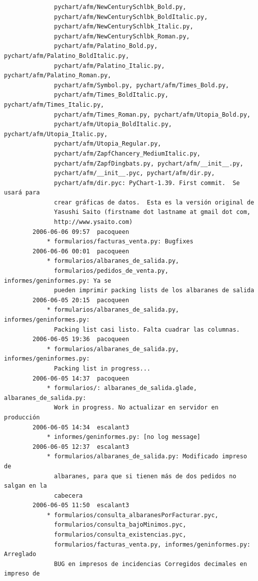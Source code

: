 \documentclass[a4paper]{article}
\begin{document}
\begin{verbatim}
              pychart/afm/NewCenturySchlbk_Bold.py,
              pychart/afm/NewCenturySchlbk_BoldItalic.py,
              pychart/afm/NewCenturySchlbk_Italic.py,
              pychart/afm/NewCenturySchlbk_Roman.py,
              pychart/afm/Palatino_Bold.py, pychart/afm/Palatino_BoldItalic.py,
              pychart/afm/Palatino_Italic.py, pychart/afm/Palatino_Roman.py,
              pychart/afm/Symbol.py, pychart/afm/Times_Bold.py,
              pychart/afm/Times_BoldItalic.py, pychart/afm/Times_Italic.py,
              pychart/afm/Times_Roman.py, pychart/afm/Utopia_Bold.py,
              pychart/afm/Utopia_BoldItalic.py, pychart/afm/Utopia_Italic.py,
              pychart/afm/Utopia_Regular.py,
              pychart/afm/ZapfChancery_MediumItalic.py,
              pychart/afm/ZapfDingbats.py, pychart/afm/__init__.py,
              pychart/afm/__init__.pyc, pychart/afm/dir.py,
              pychart/afm/dir.pyc: PyChart-1.39. First commit.  Se usará para
              crear gráficas de datos.  Esta es la versión original de
              Yasushi Saito (firstname dot lastname at gmail dot com,
              http://www.ysaito.com)
        2006-06-06 09:57  pacoqueen
            * formularios/facturas_venta.py: Bugfixes
        2006-06-06 00:01  pacoqueen
            * formularios/albaranes_de_salida.py,
              formularios/pedidos_de_venta.py, informes/geninformes.py: Ya se
              pueden imprimir packing lists de los albaranes de salida
        2006-06-05 20:15  pacoqueen
            * formularios/albaranes_de_salida.py, informes/geninformes.py:
              Packing list casi listo. Falta cuadrar las columnas.
        2006-06-05 19:36  pacoqueen
            * formularios/albaranes_de_salida.py, informes/geninformes.py:
              Packing list in progress...
        2006-06-05 14:37  pacoqueen
            * formularios/: albaranes_de_salida.glade, albaranes_de_salida.py:
              Work in progress. No actualizar en servidor en producción
        2006-06-05 14:34  escalant3
            * informes/geninformes.py: [no log message]
        2006-06-05 12:37  escalant3
            * formularios/albaranes_de_salida.py: Modificado impreso de
              albaranes, para que si tienen más de dos pedidos no salgan en la
              cabecera
        2006-06-05 11:50  escalant3
            * formularios/consulta_albaranesPorFacturar.pyc,
              formularios/consulta_bajoMinimos.pyc,
              formularios/consulta_existencias.pyc,
              formularios/facturas_venta.py, informes/geninformes.py: Arreglado
              BUG en impresos de incidencias Corregidos decimales en impreso de

\end{verbatim}
\end{document}
